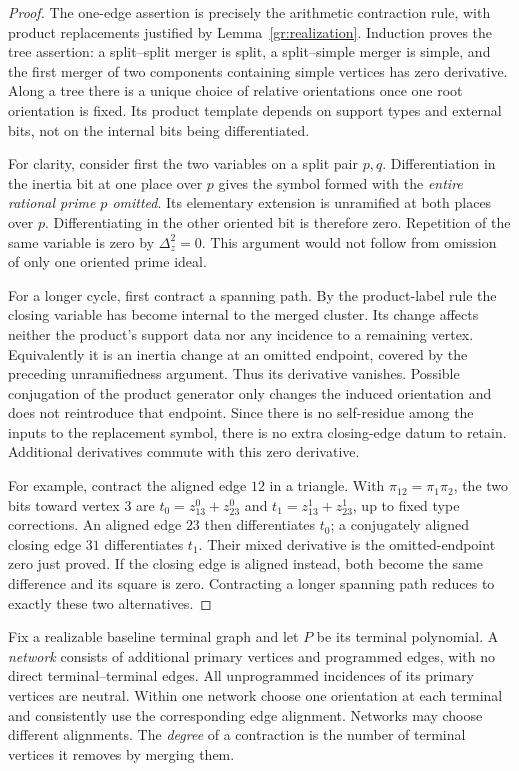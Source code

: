 \begin{proof}
The one-edge assertion is precisely the arithmetic contraction rule,
with product replacements justified by Lemma~\ref{gr:realization}.
Induction proves the tree assertion: a split--split merger is split, a
split--simple merger is simple, and the first merger of two components
containing simple vertices has zero derivative.  Along a tree there is
a unique choice of relative orientations once one root orientation is
fixed.  Its product template depends on support types and external bits,
not on the internal bits being differentiated.

For clarity, consider first the two variables on a split pair $p,q$.
Differentiation in the inertia bit at one place over $p$ gives the symbol
formed with the \emph{entire rational prime $p$ omitted}.  Its elementary
extension is unramified at both places over $p$.  Differentiating in the
other oriented bit is therefore zero.  Repetition of the same variable
is zero by $\Delta_z^2=0$.  This argument would not follow from omission
of only one oriented prime ideal.

For a longer cycle, first contract a spanning path.  By the product-label
rule the closing variable has become internal to the merged cluster.
Its change affects neither the product's support data nor any incidence
to a remaining vertex.  Equivalently it is an inertia change at an omitted
endpoint, covered by the preceding unramifiedness argument.  Thus its
derivative vanishes.  Possible conjugation of the product generator only
changes the induced orientation and does not reintroduce that endpoint.
Since there is no self-residue among the inputs to the replacement symbol,
there is no extra closing-edge datum to retain.  Additional derivatives
commute with this zero derivative.

For example, contract the aligned edge $12$ in a triangle.  With
$\pi_{12}=\pi_1\pi_2$, the two bits toward vertex $3$ are
$t_0=z_{13}^0+z_{23}^0$ and $t_1=z_{13}^1+z_{23}^1$, up to fixed
type corrections.  An aligned edge $23$ then differentiates $t_0$;
a conjugately aligned closing edge $31$ differentiates $t_1$.
Their mixed derivative is the omitted-endpoint zero just proved.
If the closing edge is aligned instead, both become the same
difference and its square is zero.  Contracting a longer spanning
path reduces to exactly these two alternatives.
\end{proof}

Fix a realizable baseline terminal graph and let $P$ be its terminal
polynomial.  A \emph{network} consists of additional primary
vertices and programmed edges, with no direct terminal--terminal edges.
All unprogrammed incidences of its primary vertices are neutral.  Within
one network choose one orientation at each terminal and consistently use
the corresponding edge alignment.  Networks may choose different
alignments.  The \emph{degree} of a contraction is the number of terminal
vertices it removes by merging them.

